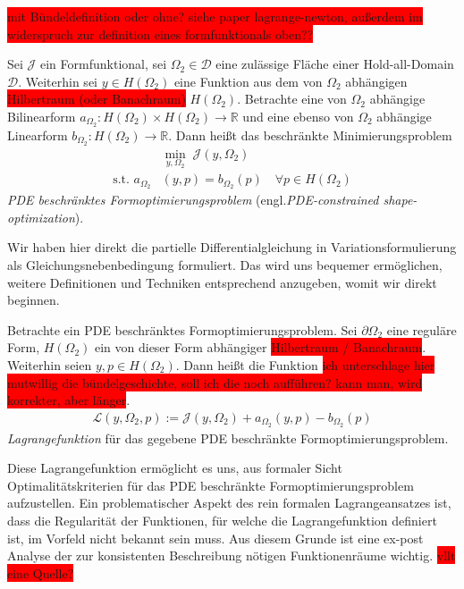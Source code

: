\colorbox{red}{mit Bündeldefinition oder ohne? siehe paper lagrange-newton, außerdem im widerspruch zur definition eines formfunktionals oben??}
\begin{defi}\label{Pde constrained shape}
Sei $\mathcal{J}$ ein Formfunktional, sei $\Omega_2 \in \mathcal{D}$ eine zulässige Fläche einer Hold-all-Domain $\mathcal{D}$. Weiterhin sei $y\in H(\Omega_2)$ eine Funktion aus dem von $\Omega_2$ abhängigen \colorbox{red}{Hilbertraum (oder Banachraum)} $H(\Omega_2)$. Betrachte eine von $\Omega_2$ abhängige Bilinearform $a_{\Omega_2}: H(\Omega_2) \times H(\Omega_2) \rightarrow \mathbb{R}$ und eine ebenso von $\Omega_2$ abhängige Linearform $b_{\Omega_2}: H(\Omega_2) \rightarrow \mathbb{R}$. Dann heißt das beschränkte Minimierungsproblem
\begin{equation}\label{PDE constrained equation}
	\begin{aligned}
	&\underset{y,\Omega_2}{\min}\;\mathcal{J}(y,\Omega_2) \\
	\text{s.t. } a_{\Omega_2}&(y,p) = b_{\Omega_2}(p) \quad \forall p\in H(\Omega_2)
	\end{aligned}
\end{equation}
\textit{PDE beschränktes Formoptimierungsproblem} (engl.\textit{PDE-constrained shape-optimization}).
\end{defi}

Wir haben hier direkt die partielle Differentialgleichung in Variationsformulierung als Gleichungsnebenbedingung formuliert. Das wird uns bequemer ermöglichen, weitere Definitionen und Techniken entsprechend anzugeben, womit wir direkt beginnen.

\begin{defi}[Lagrangefunktion]\label{lagrangefunction}
Betrachte ein PDE beschränktes Formoptimierungsproblem. Sei $\partial\Omega_2$ eine reguläre Form, $H(\Omega_2)$ ein von dieser Form abhängiger \colorbox{red}{Hilbertraum / Banachraum}. Weiterhin seien $y,p\in H(\Omega_2)$. Dann heißt die Funktion
\colorbox{red}{ich unterschlage hier mutwillig die bündelgeschichte, soll ich die noch aufführen? kann man, wird korrekter, aber länger}.
\begin{align*}
	\mathcal{L}(y,\Omega_2, p) := \mathcal{J}(y,\Omega_2) + a_{\Omega_2}(y,p) - b_{\Omega_2}(p)
\end{align*}
\textit{Lagrangefunktion} für das gegebene PDE beschränkte Formoptimierungsproblem.
\end{defi}

Diese Lagrangefunktion ermöglicht es uns, aus formaler Sicht Optimalitätskriterien für das PDE beschränkte Formoptimierungsproblem aufzustellen. Ein problematischer Aspekt des rein formalen Lagrangeansatzes ist, dass die Regularität der Funktionen, für welche die Lagrangefunktion definiert ist, im Vorfeld nicht bekannt sein muss. Aus diesem Grunde ist eine ex-post Analyse der zur konsistenten Beschreibung nötigen Funktionenräume wichtig. \colorbox{red}{vllt eine Quelle?}

